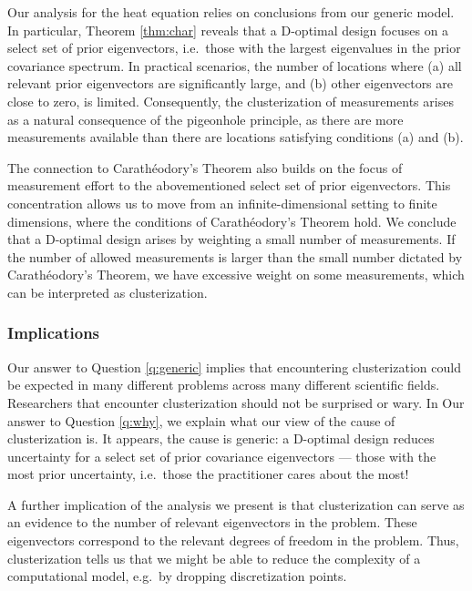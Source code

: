 \begin{enumerate}
  Our analysis for the heat equation relies on conclusions from our
  generic model. In particular, Theorem \ref{thm:char} reveals that a
  D-optimal design focuses on a select set of prior eigenvectors,
  i.e.~those with the largest eigenvalues in the prior covariance
  spectrum. In practical scenarios, the number of locations where (a)
  all relevant prior eigenvectors are significantly large, and (b)
  other eigenvectors are close to zero, is limited. Consequently, the
  clusterization of measurements arises as a natural consequence of
  the pigeonhole principle, as there are more measurements available
  than there are locations satisfying conditions (a) and (b).

  The connection to Carath\'eodory's Theorem also builds on the focus
  of measurement effort to the abovementioned select set of prior
  eigenvectors. This concentration allows us to move from an
  infinite-dimensional setting to finite dimensions, where the
  conditions of Carath\'eodory's Theorem hold. We conclude that a
  D-optimal design arises by weighting a small number of
  measurements. If the number of allowed measurements is larger than
  the small number dictated by Carath\'eodory's Theorem, we have
  excessive weight on some measurements, which can be interpreted as
  clusterization.
  
\end{enumerate}

\subsubsection{Implications}\label{subsub:implications}
Our answer to Question \ref{q:generic} implies that encountering
clusterization could be expected in many different problems across
many different scientific fields. Researchers that encounter
clusterization should not be surprised or wary. In Our answer to
Question \ref{q:why}, we explain what our view of the cause of
clusterization is. It appears, the cause is generic: a D-optimal
design reduces uncertainty for a select set of prior covariance
eigenvectors --- those with the most prior uncertainty, i.e.~those the
practitioner cares about the most!

A further implication of the analysis we present is that
clusterization can serve as an evidence to the number of relevant
eigenvectors in the problem. These eigenvectors correspond to the
relevant degrees of freedom in the problem. Thus, clusterization tells
us that we might be able to reduce the complexity of a computational
model, e.g.~by dropping discretization points.

